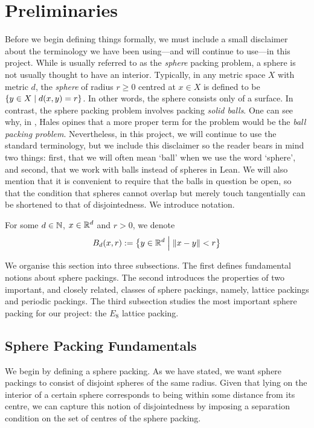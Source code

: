 \section{Preliminaries}

Before we begin defining things formally, we must include a small disclaimer about the terminology we have been using---and will continue to use---in this project. While  is usually referred to as the \textit{sphere} packing problem, a sphere is not usually thought to have an interior. Typically, in any metric space $X$ with metric $d$, the \textit{sphere} of radius $r \geq 0$ centred at $x \in X$ is defined to be $\left\{ y \in X \; \middle\vert \; d(x, y) = r \right\}$. In other words, the sphere consists only of a surface. In contrast, the sphere packing problem involves packing \textit{solid balls}. One can see why, in \cite{CannonHoney}, Hales opines that a more proper term for the problem would be the \textit{ball packing problem}. Nevertheless, in this project, we will continue to use the standard terminology, but we include this disclaimer so the reader bears in mind two things: first, that we will often mean `ball' when we use the word `sphere', and second, that we work with balls instead of spheres in Lean. We will also mention that it is convenient to require that the balls in question be open, so that the condition that spheres cannot overlap but merely touch tangentially can be shortened to that of disjointedness. We introduce notation.

\begin{boxnotation}
    For some $d \in \mathbb{N}$, $x \in \mathbb{R}^d$ and $r > 0$, we denote
    \begin{align*}
        B_d(x, r) := \left\{ y \in \mathbb{R}^d \; \middle\vert \; \left\lVert x - y \right\rVert < r \right\}
    \end{align*}
\end{boxnotation}

We organise this section into three subsections. The first defines fundamental notions about sphere packings. The second introduces the properties of two important, and closely related, classes of sphere packings, namely, lattice packings and periodic packings. The third subsection studies the most important sphere packing for our project: the $E_8$ lattice packing.

\subsection{Sphere Packing Fundamentals}

We begin by defining a sphere packing. As we have stated, we want sphere packings to consist of disjoint spheres of the same radius. Given that lying on the interior of a certain sphere corresponds to being within some distance from its centre, we can capture this notion of disjointedness by imposing a separation condition on the set of centres of the sphere packing.

